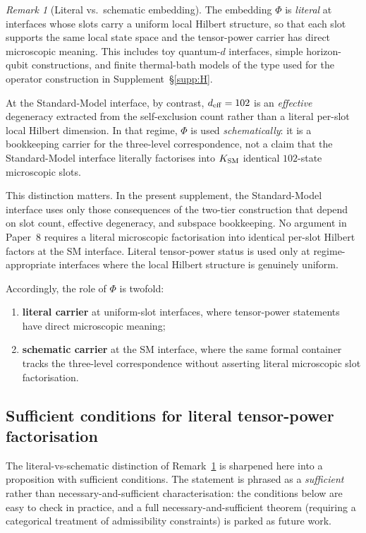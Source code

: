 \documentclass[11pt]{article}
\theoremstyle{plain}
\theoremstyle{definition}
\theoremstyle{remark}
\newtheorem{remark}[theorem]{Remark}
\begin{document}
\begin{remark}[Literal vs.\ schematic embedding]\label{rem:literal_schematic}
The embedding $\Phi$ is \emph{literal} at interfaces whose slots carry a uniform local Hilbert structure, so that each slot supports the same local state space and the tensor-power carrier has direct microscopic meaning.  This includes toy quantum-$d$ interfaces, simple horizon-qubit constructions, and finite thermal-bath models of the type used for the operator construction in Supplement~\S\ref{supp:H}.

At the Standard-Model interface, by contrast, $d_{\rm eff} = 102$ is an \emph{effective} degeneracy extracted from the self-exclusion count rather than a literal per-slot local Hilbert dimension.  In that regime, $\Phi$ is used \emph{schematically}: it is a bookkeeping carrier for the three-level correspondence, not a claim that the Standard-Model interface literally factorises into $K_{\rm SM}$ identical $102$-state microscopic slots.

This distinction matters.  In the present supplement, the Standard-Model interface uses only those consequences of the two-tier construction that depend on slot count, effective degeneracy, and subspace bookkeeping.  No argument in Paper~8 requires a literal microscopic factorisation into identical per-slot Hilbert factors at the SM interface.  Literal tensor-power status is used only at regime-appropriate interfaces where the local Hilbert structure is genuinely uniform.

Accordingly, the role of $\Phi$ is twofold:
\begin{enumerate}[leftmargin=2.5em,label=\textup{(\roman*)}]
  \item \textbf{literal carrier} at uniform-slot interfaces, where tensor-power statements have direct microscopic meaning;
  \item \textbf{schematic carrier} at the SM interface, where the same formal container tracks the three-level correspondence without asserting literal microscopic slot factorisation.
\end{enumerate}
\end{remark}

\bigskip

\subsection{Sufficient conditions for literal tensor-power factorisation}\label{supp:C3}

The literal-vs-schematic distinction of Remark~\ref{rem:literal_schematic} is sharpened here into a proposition with sufficient conditions.  The statement is phrased as a \emph{sufficient} rather than necessary-and-sufficient characterisation: the conditions below are easy to check in practice, and a full necessary-and-sufficient theorem (requiring a categorical treatment of admissibility constraints) is parked as future work.
\end{document}
